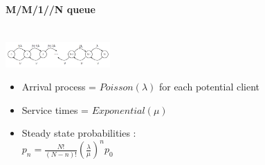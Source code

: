 \documentclass[paper=a4,fontsize=8pt,pagesize,DIV=calc]{scrartcl}
\begin{document}
\begin{multicols}{3}
\paragraph{M/M/1//N queue}~~\\
\includegraphics[width=0.3\textwidth]{MMN}
\begin{itemize}
\item Arrival process = $Poisson(\lambda)$ for each potential client
\item Service times = $Exponential(\mu)$ 
\item Steady state probabilities : 
\\$p_n=\frac{N!}{(N-n)!}\left(\frac{\lambda}{\mu}\right)^n p_0$
\end{itemize}

\end{multicols}
\end{document}
